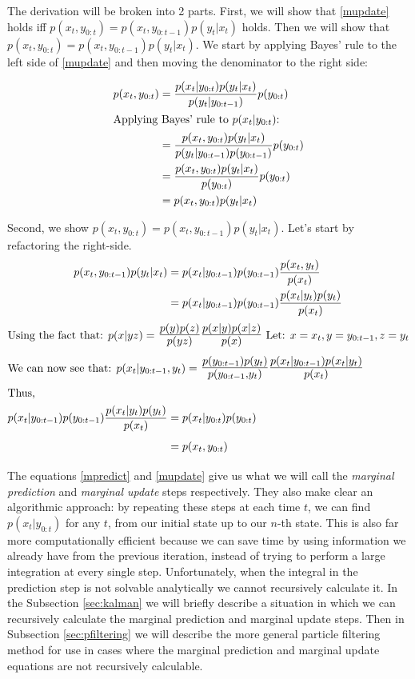 \documentclass{article}
\begin{document}
The derivation will be broken into 2 parts. First, we will show that \eqref{mupdate} holds iff $p(x_t,y_{0:t}) = p(x_t,y_{0:t-1})p(y_t|x_t)$ holds. Then we will show that $p(x_t,y_{0:t}) = p(x_t,y_{0:t-1})p(y_t|x_t)$. We start by applying Bayes' rule to the left side of \eqref{mupdate} and then moving the denominator to the right side:

\begin{align*}
p(x_t,y_{0:t}) &= \frac{p(x_t|y_{0:t})p(y_t|x_t)}{p(y_t|y_{0:t-1})}p(y_{0:t}) \\
\intertext{Applying Bayes' rule to $p(x_t|y_{0:t})$:}
&= \frac{p(x_t,y_{0:t})p(y_t|x_t)}{p(y_t|y_{0:t-1})p(y_{0:t-1})}p(y_{0:t}) \\
&= \frac{p(x_t,y_{0:t})p(y_t|x_t)}{p(y_{0:t})}p(y_{0:t}) \\
&= p(x_t,y_{0:t})p(y_t|x_t)
\end{align*}

\noindent
Second, we show $p(x_t,y_{0:t}) = p(x_t,y_{0:t-1})p(y_t|x_t)$. Let's start by refactoring the right-side.
\begin{align*}
p(x_t,y_{0:t-1})p(y_t|x_t) &= p(x_t|y_{0:t-1})p(y_{0:t-1})\frac{p(x_t,y_t)}{p(x_t)}\\
&= p(x_t|y_{0:t-1})p(y_{0:t-1})\frac{p(x_t|y_t)p(y_t)}{p(x_t)}\\
\intertext{Using the fact that: $p(x|yz) =$ {\Large $\frac{p(y)p(z)}{p(yz)}\frac{p(x|y)p(x|z)}{p(x)}$}
  Let: $x=x_t, y=y_{0:t-1}, z = y_t$}
\intertext{We can now see that:  $p(x_t|y_{0:t-1},y_t) =$ {\Large $\frac{p(y_{0:t-1})p(y_t)}{p(y_{0:t-1},y_t)}\frac{p(x_t|y_{0:t-1})p(x_t|y_t)}{p(x_t)}$}}
\intertext{Thus,}
p(x_t|y_{0:t-1})p(y_{0:t-1})\frac{p(x_t|y_t)p(y_t)}{p(x_t)} &= p(x_t|y_{0:t})p(y_{0:t})\\
&= p(x_t,y_{0:t})\\
\end{align*}

The equations \eqref{mpredict} and \eqref{mupdate} give us what we will call the \textit{marginal prediction} and \textit{marginal update} steps respectively. They also make clear an algorithmic approach: by repeating these steps at each time $t$, we can find
$p(x_t|y_{0:t})$ for any $t$, from our initial state up to our $n$-th state. This is also far more computationally efficient because we can save time by using information we already have from the previous iteration, instead of trying to perform a large integration at every single step. Unfortunately, when the integral in the prediction step is not solvable analytically we cannot recursively calculate it. In the Subsection \ref{sec:kalman} we will briefly describe a situation in which we can recursively calculate the marginal prediction and marginal update steps. Then in Subsection \ref{sec:pfiltering} we will describe the more general particle filtering method for use in cases where the marginal prediction and marginal update equations are not recursively calculable.
\end{document}
